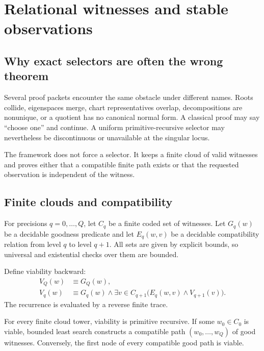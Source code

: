 \section{Relational witnesses and stable observations}

\subsection{Why exact selectors are often the wrong theorem}

Several proof packets encounter the same obstacle under different names.
Roots collide, eigenspaces merge, chart representatives overlap, decompositions
are nonunique, or a quotient has no canonical normal form.  A classical proof
may say ``choose one'' and continue.  A uniform primitive-recursive selector
may nevertheless be discontinuous or unavailable at the singular locus.

The framework does not force a selector.  It keeps a finite cloud of valid
witnesses and proves either that a compatible finite path exists or that the
requested observation is independent of the witness.

\subsection{Finite clouds and compatibility}

For precisions \(q=0,\ldots,Q\), let \(C_q\) be a finite coded set of witnesses.
Let \(G_q(w)\) be a decidable goodness predicate and let
\(E_q(w,v)\) be a decidable compatibility relation from level \(q\) to level
\(q+1\).  All sets are given by explicit bounds, so universal and existential
checks over them are bounded.

Define viability backward:
\[
\begin{aligned}
 V_Q(w)&\equiv G_Q(w),\\
 V_q(w)&\equiv G_q(w)\wedge
          \exists v\in C_{q+1}\bigl(E_q(w,v)\wedge V_{q+1}(v)\bigr).
\end{aligned}
\]
The recurrence is evaluated by a reverse finite trace.

\begin{theorem}\label{thm:viability}
For every finite cloud tower, viability is primitive recursive.  If some
\(w_0\in C_0\) is viable, bounded least search constructs a compatible path
\((w_0,\ldots,w_Q)\) of good witnesses.  Conversely, the first node of every
compatible good path is viable.
\end{theorem}

